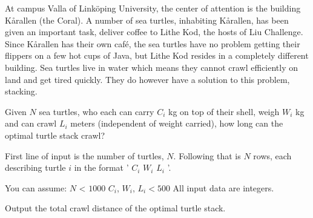 At campus Valla of Linköping University, the center of attention is the building Kårallen (the Coral). A number of sea turtles, inhabiting Kårallen, has been given an important task, deliver coffee to Lithe Kod, the hosts of Liu Challenge. Since Kårallen has their own café, the sea turtles have no problem getting their flippers on a few hot cups of Java, but Lithe Kod resides in a completely different building. Sea turtles live in water which means they cannot crawl efficiently on land and get tired quickly. They do however have a solution to this problem, stacking.

Given $N$ sea turtles, who each can carry $C_i$ kg on top of their shell, weigh $W_i$ kg and can crawl $L_i$ meters (independent of weight carried), how long can the optimal turtle stack crawl?

First line of input is the number of turtles, $N$. Following that is $N$ rows, each describing turtle $i$ in the format ' $C_i$ $W_i$ $L_i$ '.

You can assume: \newline
$N$ < $1000$ \newline
$C_i$, $W_i$, $L_i < 500$ \newline
All input data are integers.


Output the total crawl distance of the optimal turtle stack.